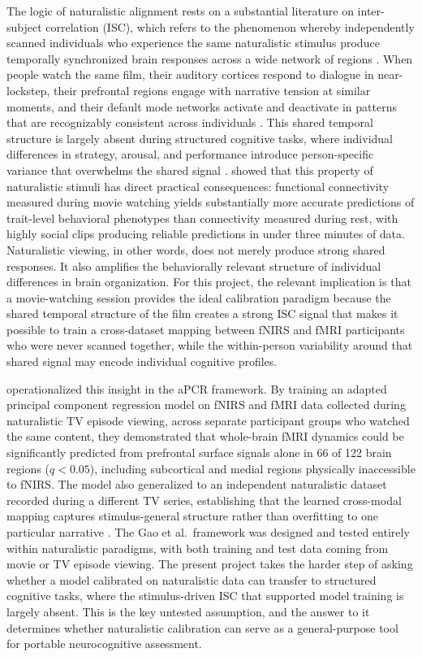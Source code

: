 The logic of naturalistic alignment rests on a substantial literature on inter-subject correlation (ISC), which refers to the phenomenon whereby independently scanned individuals who experience the same naturalistic stimulus produce temporally synchronized brain responses across a wide network of regions \citep{hasson2004, hasson2010, nastase2019}. When people watch the same film, their auditory cortices respond to dialogue in near-lockstep, their prefrontal regions engage with narrative tension at similar moments, and their default mode networks activate and deactivate in patterns that are recognizably consistent across individuals \citep{hasson2010}. This shared temporal structure is largely absent during structured cognitive tasks, where individual differences in strategy, arousal, and performance introduce person-specific variance that overwhelms the shared signal \citep{nastase2019}. \citet{finn2021} showed that this property of naturalistic stimuli has direct practical consequences: functional connectivity measured during movie watching yields substantially more accurate predictions of trait-level behavioral phenotypes than connectivity measured during rest, with highly social clips producing reliable predictions in under three minutes of data. Naturalistic viewing, in other words, does not merely produce strong shared responses. It also amplifies the behaviorally relevant structure of individual differences in brain organization. For this project, the relevant implication is that a movie-watching session provides the ideal calibration paradigm because the shared temporal structure of the film creates a strong ISC signal that makes it possible to train a cross-dataset mapping between fNIRS and fMRI participants who were never scanned together, while the within-person variability around that shared signal may encode individual cognitive profiles.

\citet{gao2025} operationalized this insight in the aPCR framework. By training an adapted principal component regression model on fNIRS and fMRI data collected during naturalistic TV episode viewing, across separate participant groups who watched the same content, they demonstrated that whole-brain fMRI dynamics could be significantly predicted from prefrontal surface signals alone in 66 of 122 brain regions ($q < 0.05$), including subcortical and medial regions physically inaccessible to fNIRS. The model also generalized to an independent naturalistic dataset recorded during a different TV series, establishing that the learned cross-modal mapping captures stimulus-general structure rather than overfitting to one particular narrative \citep{gao2025}. The Gao et al.\ framework was designed and tested entirely within naturalistic paradigms, with both training and test data coming from movie or TV episode viewing. The present project takes the harder step of asking whether a model calibrated on naturalistic data can transfer to structured cognitive tasks, where the stimulus-driven ISC that supported model training is largely absent. This is the key untested assumption, and the answer to it determines whether naturalistic calibration can serve as a general-purpose tool for portable neurocognitive assessment.

